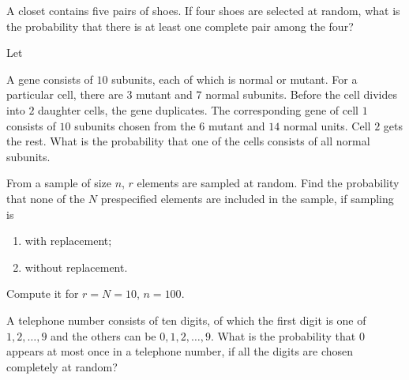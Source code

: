 \begin{problem}
  A closet contains five pairs of shoes. If four shoes are selected at
  random, what is the probability that there is at least one complete pair
  among the four?
\end{problem}
\begin{solution}
  Let
\end{solution}
\newpage

\begin{problem}
  A gene consists of \(10\) subunits, each of which is normal or
  mutant. For a particular cell, there are \(3\) mutant and \(7\) normal
  subunits. Before the cell divides into \(2\) daughter cells, the gene
  duplicates. The corresponding gene of cell \(1\) consists of \(10\)
  subunits chosen from the \(6\) mutant and \(14\) normal units. Cell \(2\)
  gets the rest. What is the probability that one of the cells consists of
  all normal subunits.
\end{problem}
\begin{solution}

\end{solution}
\newpage

\begin{problem}
  From a sample of size \(n\), \(r\) elements are sampled at random. Find
  the probability that none of the \(N\) prespecified elements are included
  in the sample, if sampling is
  \begin{enumerate}[label=(\alph*)]
  \item with replacement;
  \item without replacement.
  \end{enumerate}
  Compute it for \(r=N=10\), \(n=100\).
\end{problem}
\begin{solution}

\end{solution}
\newpage

\begin{problem}
  A telephone number consists of ten digits, of which the first digit is
  one of \(1,2,\dotsc,9\) and the others can be \(0,1,2,\dotsc,9\). What is
  the probability that \(0\) appears at most once in a telephone number, if
  all the digits are chosen completely at random?
\end{problem}
\begin{solution}

\end{solution}
\newpage

